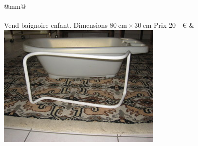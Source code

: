 \documentclass[margin=3mm]{petiteannonce}
\begin{document}
{%
  \tabcolsep=10pt\relax
  \petiteannonceaddtowidth{-2\tabcolsep}%
  \begin{tabular}%
    {@{}m{}m{}@{}}
    \\
    \hline\\
    Vend baignoire enfant.\newline 
    Dimensions \(\SI {80}{\centi \metre }\times \SI 
    {30}{\centi \metre }\)\newline
    Prix 20\si{~}\euro
    &
    \includegraphics[width=\petiteannoncewidth{0.5}]{baignoire.jpg}
  \end{tabular}
}
\end{document}
